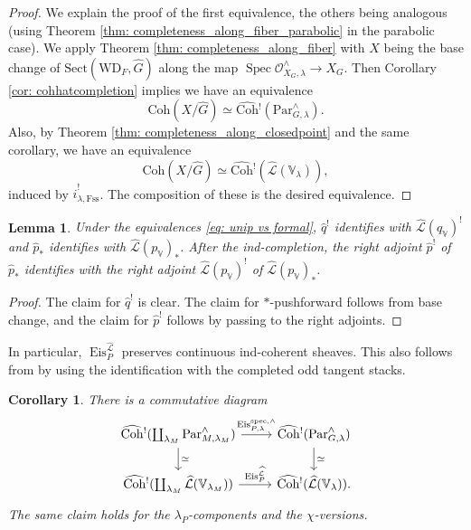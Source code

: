 \documentclass{amsart}
\newtheorem{lemma}[theorem]{Lemma}
\newtheorem{corollary}[theorem]{Corollary}
\theoremstyle{definition}
\theoremstyle{remark}
\numberwithin{equation}{section}
\DeclareMathOperator{\Spec}{Spec}
\newcommand{\mc}{\mathcal}
\newcommand{\spec}{\mathrm{spec}}
\newcommand{\wh}{\widehat}
\newcommand{\Par}{\mathrm{Par}}
\DeclareMathOperator{\Eis}{\mathrm{Eis}}
\newcommand{\Coh}{\mathrm{Coh}}
\newcommand{\V}{\mathbb{V}}
\newcommand{\WD}{\mathrm{WD}}
\newcommand{\Sect}{\mathrm{Sect}}
\begin{document}
\begin{proof}
We explain the proof of the first equivalence, the others being analogous (using Theorem \ref{thm: completeness_along_fiber_parabolic} in the parabolic case). We apply Theorem \ref{thm: completeness_along_fiber} with $X$ being the base change of $\Sect(\WD_F, \wh{G})$ along the map $\Spec \mc O_{X_G,\lambda}^\wedge\to X_G$. Then Corollary \ref{cor: cohhatcompletion} implies we have an equivalence
\begin{equation*}
    \Coh(X/\wh{G}) \simeq \wh{\Coh}{}^!(\Par^{\wedge}_{G, \lambda}).
\end{equation*}
Also, by Theorem \ref{thm: completeness_along_closedpoint} and the same corollary, we have an equivalence
\begin{equation*}
      \Coh(X / \wh{G}) \simeq \wh{\Coh}{}^!(\wh{\mc{L}}(\V_{\lambda})),
\end{equation*}
induced by $\wh{i}^!_{\lambda, \mathrm{Fss}}$. The composition of these is the desired equivalence. 


\end{proof}

\begin{lemma}
Under the equivalences \eqref{eq: unip vs formal}, $\hat{q}^!$ identifies with $\wh{\mc{L}}(q_\V)^!$ and $\hat{p}_*$ identifies with $\wh{\mc{L}}(p_\V)_*$. After the ind-completion, the right adjoint $\hat{p}^!$ of $\hat{p}_*$ identifies with the right adjoint $\wh{\mc{L}}(p_\V)^!$ of $\wh{\mc{L}}(p_\V)_*$.
\end{lemma}

\begin{proof}
The claim for $\hat{q}^!$ is clear. The claim for $*$-pushforward follows from base change, and the claim for $\hat{p}^!$ follows by passing to the right adjoints.
\end{proof}

In particular, $\Eis_{P}^{\wh{\mc{L}}}$ preserves continuous ind-coherent sheaves. This also follows from \cite[Theorem 2.3.6]{Chen2023categorical} by using the identification with the completed odd tangent stacks. 

\begin{corollary}{\label{cor: unipvsformalEis}}
There is a commutative diagram
\[
\begin{tikzcd}
\wh{\Coh}{}^! (\coprod_{\lambda_M} \Par^\wedge_{M,\lambda_M}) \arrow[r, "\Eis_{P,\lambda}^{\spec, \wedge}"] \arrow[d, "\simeq"] 
& \wh{\Coh}{}^! (\Par^\wedge_{G, \lambda}) \arrow[d, "\simeq"] \\
\wh{\Coh}{}^! (\coprod_{\lambda_M }\wh{\mc{L}}(\V_{\lambda_M})) \arrow[r, "\Eis_{P}^{\wh{\mc{L}}}"]
& \wh{\Coh}{}^! (\wh{\mc{L}}(\V_\lambda)). 
\end{tikzcd}
\] 
The same claim holds for the $\lambda_P$-components and the $\chi$-versions. 
\end{corollary}
\end{document}
